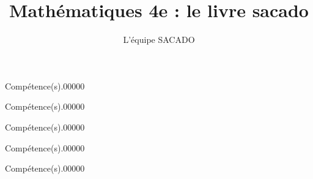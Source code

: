 \documentclass[a4paper,dvipsnames,french,10pt]{book}
\title{Mathématiques 4e  : le livre sacado}
\author{L'équipe SACADO}
\begin{document}




%


\begin{pageParcoursu} %

\begin{ExoCuN}{Compétence(s).}{0}{0}{0}{0}{0}

\end{ExoCuN}

\begin{ExoCuN}{Compétence(s).}{0}{0}{0}{0}{0}

\end{ExoCuN}

\begin{ExoCuN}{Compétence(s).}{0}{0}{0}{0}{0}

\end{ExoCuN}

\begin{ExoCuN}{Compétence(s).}{0}{0}{0}{0}{0}

\end{ExoCuN}

\begin{ExoCuN}{Compétence(s).}{0}{0}{0}{0}{0}

\end{ExoCuN}

\end{pageParcoursu} %
\end{document}
